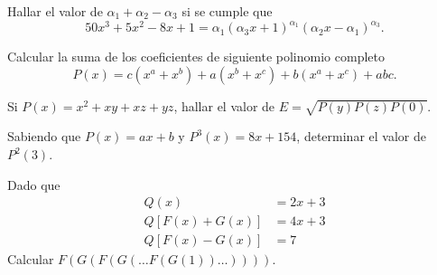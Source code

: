 \begin{multicols}{2}
    \begin{problem}
        Hallar el valor de $\alpha_1 + \alpha_2 - \alpha_3$ si se cumple que
        \[
            50x^3 + 5x^2 - 8x + 1 = \alpha_1 (\alpha_3 x + 1)^{\alpha_1} (\alpha_2 x - \alpha_1)^{\alpha_3}.
        \]
    \end{problem}

    \begin{problem}
        Calcular la suma de los coeficientes de siguiente polinomio completo
        \[
            P(x) = c(x^a + x^b) + a(x^b + x^c) + b(x^a + x^c) + abc.
        \]
    \end{problem}

    \begin{problem}
        Si $P(x) = x^2 + xy + xz + yz$, hallar el valor de $E = \sqrt {P(y)P(z)P(0)}$.
    \end{problem}

    \begin{problem}
        Sabiendo que $P(x) = ax + b$ y $P^3(x) = 8x + 154$, determinar el valor de $P^2(3)$.
    \end{problem}

    \begin{problem}
        Dado que
        \begin{align*}
            Q(x) &= 2x + 3 \\
            Q\left[ F(x) + G(x) \right] &= 4x + 3 \\
            Q\left[ F(x) - G(x) \right] &= 7
        \end{align*}
        Calcular $F(G(F(G(\dots F(G(1))\dots))))$.
    \end{problem}
\end{multicols}